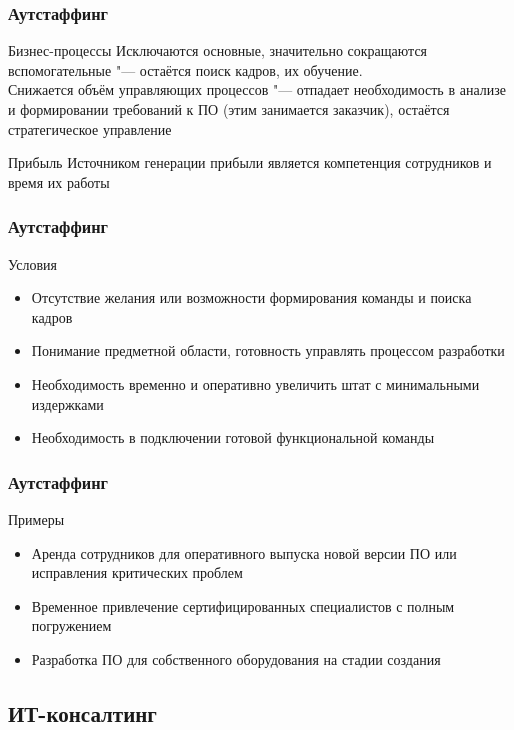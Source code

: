\documentclass{../industrial-development}
\begin{document}
\begin{frame} \frametitle{Аутстаффинг}
	\begin{block}{Бизнес-процессы}
		Исключаются основные, значительно сокращаются вспомогательные "--- остаётся поиск кадров, их обучение.\\
		Снижается объём управляющих процессов "--- отпадает необходимость в анализе и формировании требований к ПО (этим занимается заказчик), остаётся стратегическое управление
	\end{block}
	\begin{block}{Прибыль}
		Источником генерации прибыли является компетенция сотрудников и время их работы
	\end{block}
\end{frame}
\lecturenotes


\begin{frame} \frametitle{Аутстаффинг}
	\begin{block}{Условия}
		\begin{itemize}
			\item Отсутствие желания или возможности формирования команды и поиска кадров
			\item Понимание предметной области, готовность управлять процессом разработки
			\item Необходимость временно и оперативно увеличить штат с минимальными издержками
			\item Необходимость в подключении готовой функциональной команды
		\end{itemize}
	\end{block}
\end{frame}
\lecturenotes


\begin{frame} \frametitle{Аутстаффинг}
	\begin{block}{Примеры}
		\begin{itemize}
			\item Аренда сотрудников для оперативного выпуска новой версии ПО или исправления критических проблем
			\item Временное привлечение сертифицированных специалистов с полным погружением
			\item Разработка ПО для собственного оборудования на стадии создания
		\end{itemize}
	\end{block}
\end{frame}
\lecturenotes


\subsection{ИТ-консалтинг}
\end{document}
